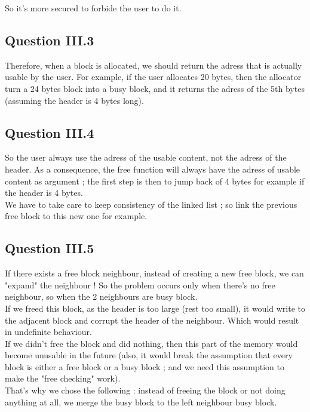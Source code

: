 \documentclass[twoside]{article}
\begin{document}
So it's more secured to forbide the user to do it.

\subsection{Question III.3}
Therefore, when a block is allocated, we should return the adress that is
actually usable by the user. For example, if the user allocates 20 bytes, then
the allocator turn a 24 bytes block into a busy block, and it returns the
adress of the 5th bytes (assuming the header is 4 bytes long).

\subsection{Question III.4}
So the user always use the adress of the usable content, not the adress of
the header. As a consequence, the free function will always have the adress
of usable content as argument ; the first step is then to jump back of 4
bytes for example if the header is 4 bytes.\\

We have to take care to keep consistency of the linked list ; so link the
previous free block to this new one for example.

\subsection{Question III.5}
If there exists a free block neighbour, instead of creating a new free
block, we can "expand" the neighbour ! So the problem occurs only when there's
no free neighbour, so when the 2 neighbours are busy block.\\

If we freed this block, as the header is too large (rest too small), it would
write to the adjacent block and corrupt the header of the neighbour. Which
would result in undefinite behaviour.\\

If we didn't free the block and did nothing, then this part of the memory would
become unusable in the future (also, it would break the assumption that every
block is either a free block or a busy block ; and we need this assumption to
make the "free checking" work).\\

That's why we chose the following : instead of freeing the block or not doing
anything at all, we merge the busy block to the left neighbour busy block.
\end{document}
